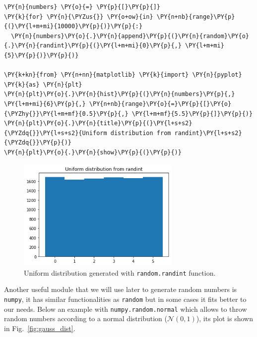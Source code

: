  \begin{tcolorbox}[breakable, size=fbox, boxrule=1pt, pad at break*=1mm,colback=cellbackground, colframe=cellborder]
\begin{Verbatim}[commandchars=\\\{\}]
\PY{n}{numbers} \PY{o}{=} \PY{p}{[}\PY{p}{]}
\PY{k}{for} \PY{n}{\PYZus{}} \PY{o+ow}{in} \PY{n+nb}{range}\PY{p}{(}\PY{l+m+mi}{10000}\PY{p}{)}\PY{p}{:}
  \PY{n}{numbers}\PY{o}{.}\PY{n}{append}\PY{p}{(}\PY{n}{random}\PY{o}{.}\PY{n}{randint}\PY{p}{(}\PY{l+m+mi}{0}\PY{p}{,} \PY{l+m+mi}{5}\PY{p}{)}\PY{p}{)}

\PY{k+kn}{from} \PY{n+nn}{matplotlib} \PY{k}{import} \PY{n}{pyplot} \PY{k}{as} \PY{n}{plt}
\PY{n}{plt}\PY{o}{.}\PY{n}{hist}\PY{p}{(}\PY{n}{numbers}\PY{p}{,} \PY{l+m+mi}{6}\PY{p}{,} \PY{n+nb}{range}\PY{o}{=}\PY{p}{[}\PY{o}{\PYZhy{}}\PY{l+m+mf}{0.5}\PY{p}{,} \PY{l+m+mf}{5.5}\PY{p}{]}\PY{p}{)}
\PY{n}{plt}\PY{o}{.}\PY{n}{title}\PY{p}{(}\PY{l+s+s2}{\PYZdq{}}\PY{l+s+s2}{Uniform distribution from randint}\PY{l+s+s2}{\PYZdq{}}\PY{p}{)}
\PY{n}{plt}\PY{o}{.}\PY{n}{show}\PY{p}{(}\PY{p}{)}
\end{Verbatim}
\end{tcolorbox}

\begin{figure}[h]
\centering
\includegraphics[width=0.7\textwidth]{lecture_6_files/lecture_6_28_0.png}
\caption{Uniform distribution generated with \texttt{random.randint} function.}
\label{fig:uniform_dist}
\end{figure}
    
Another useful module that we will use later to generate random numbers is \texttt{numpy}, it has similar functionalities as \texttt{random} but in some cases it fits better to our needs.    
Below an example with \texttt{numpy.random.normal} which allows to throw random numbers according to a normal distribution
(\(\mathcal{N}(0, 1)\)), its plot is shown in Fig.~\ref{fig:gauss_dist}.

